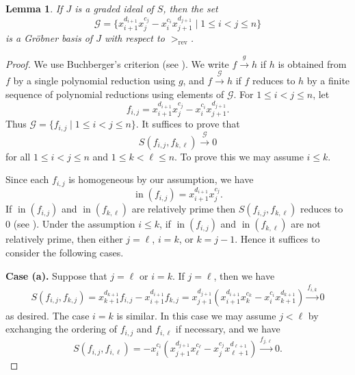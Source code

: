 \documentclass[12pt]{amsart}
\numberwithin{equation}{section}
\newtheorem{lemma}[theorem]{Lemma}
\theoremstyle{definition}
\newcommand{\init}{\ensuremath{\mathop{\mathrm{in}}}}
\begin{document}
\begin{lemma}
    \label{lem2.0}
If $J$ is a graded ideal of $S$, then the set
\[\mathcal G=\{x_{i+1}^{d_{i+1}}x_j^{c_j} -x_i^{c_i}x_{j+1}^{d_{j+1}} \mid 1 \leq i < j \leq n\}\]
is a Gr\"obner basis of $J$ with respect to $>_{\mathrm{rev}}$.
\end{lemma}


\begin{proof}
We use Buchberger's criterion (see \cite[Theorem 2.3.2]{HH}).
We write
$f \xrightarrow{g} h$
if $h$ is obtained from $f$ by a single polynomial reduction using $g$,
and
$f \xrightarrow{\mathcal G} h$
if $f$ reduces to $h$ by a finite sequence of polynomial reductions
using elements of $\mathcal G$.
For $1 \leq i<j \leq n$, let
\[f_{i,j}=x_{i+1}^{d_{i+1}}x_j^{c_j}-x_i^{c_i} x_{j+1}^{d_{j+1}}.\]
Thus $\mathcal G=\{f_{i,j} \mid 1 \leq i< j \leq n\}$.
It suffices to prove that
\[
S(f_{i,j},f_{k,\ell}) \stackrel {\mathcal G} \longrightarrow 0
\]
for all $1\leq i<j\leq n$ and $1 \leq k<\ell \leq n$.
To prove this we may assume $i \leq k$.

Since each $f_{i,j}$ is homogeneous by our assumption,
we have
\[\init(f_{i,j})=x_{i+1}^{d_{i+1}}x_j^{c_j}.\]
If $\init(f_{i,j})$ and $\init(f_{k,\ell})$ are relatively prime then $S(f_{i,j},f_{k,\ell})$ reduces to $0$ (see \cite[Lemma 2.3.1]{HH}).
Under the assumption $i\leq k$, if
$\init(f_{i,j})$ and $\init(f_{k,\ell})$ are not relatively prime,
then either $j=\ell$, $i=k$, or $k=j-1$.
Hence it suffices to consider the following cases.

\textbf{Case (a).} Suppose that $j=\ell$ or $i=k$.
If $j=\ell$,
then we have 
\begin{align*}
S(f_{i,j},f_{k,j})
=x_{k+1}^{d_{k+1}}f_{i,j}-x_{i+1}^{d_{i+1}}f_{k,j}
=x_{j+1}^{d_{j+1}}
\left(x_{i+1}^{d_{i+1}}x_k^{c_k}
-x_i^{c_i}x_{k+1}^{d_{k+1}}\right)
\stackrel {f_{i,k}}\longrightarrow 0
\end{align*}
as desired.
The case $i=k$ is similar.
In this case we may assume $j<\ell$ by exchanging the ordering of $f_{i,j}$ and $f_{i,\ell}$ if necessary,
and we have
\[
S(f_{i,j},f_{i,\ell})
=-x_i^{c_i} (x_{j+1}^{d_{j+1}}x_\ell^{c_\ell}-x_j^{c_j}x_{\ell+1}^{d_{\ell+1}})
\stackrel{f_{j,\ell}} \longrightarrow 0.
\]



\end{proof}
\end{document}
